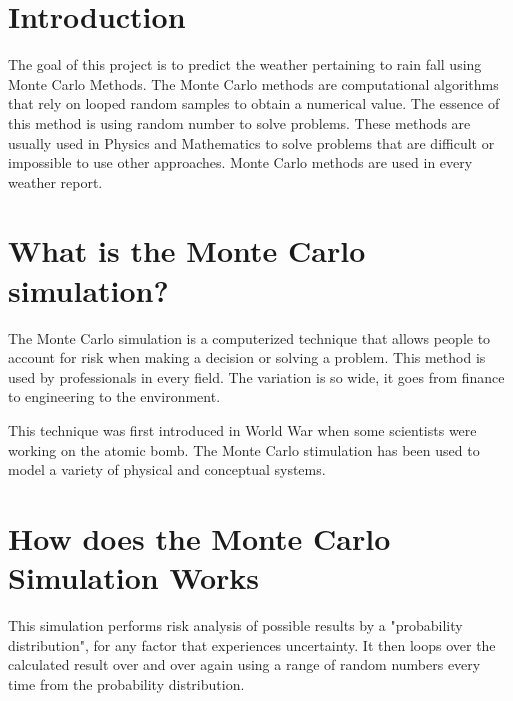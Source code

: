 \documentclass[twocolumn]{revtex4}
\begin{document}
\maketitle

\section{Introduction}

The goal of this project is to predict the weather pertaining to rain fall using Monte Carlo Methods. The Monte Carlo methods are computational algorithms that rely on looped random samples to obtain a numerical value. The essence of this method is using  random number to solve problems. These methods are usually used in Physics and Mathematics to solve problems that are difficult or impossible to use other approaches. Monte Carlo methods are used in every weather report. 


\section{What is the Monte Carlo simulation?}

The Monte Carlo simulation is a computerized technique that allows people to account for risk when making a decision or solving a problem. This method is used by professionals in every field. The variation is so wide, it goes from finance to engineering to the environment. 


This technique was first introduced in World War when some scientists were working on the atomic bomb. The Monte Carlo stimulation has been used to model a variety of physical and conceptual systems. 

\section{How does the Monte Carlo Simulation Works}
This simulation performs risk analysis of possible results by a  "probability distribution", for any factor that experiences uncertainty. It then loops over the calculated result over and over again using a range of random numbers every time from the probability distribution. 
\end{document}
